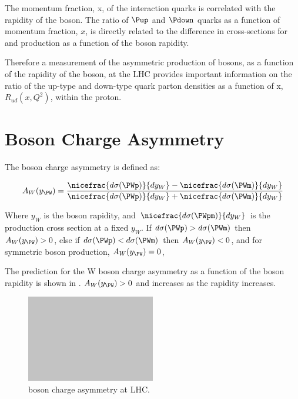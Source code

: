 The momentum fraction, x, of the interaction quarks is correlated
with the rapidity of the \PW boson. The ratio of $\Pup$ and $\Pdown$ quarks as
a function of momentum fraction, $x$, is directly related to the difference in
cross-sections for \PWp and \PWm production as a function of the boson
rapidity.

Therefore a measurement of the asymmetric production of \PW bosons, as a
function of the rapidity of the boson, at the \ac{LHC} provides important
information on the ratio of the up-type and down-type quark parton densities as
a function of x,
$R_{ud}(x,Q^2)$, within the proton. 

\section{\PW Boson Charge Asymmetry}

The \PWpm boson charge asymmetry is defined as:

\begin{equation}
  A_{W}(y_{\PW})=
    \frac{ 
      \nicefrac{ d\sigma (\PWp) }{ dy_{W} } -
      \nicefrac{ d\sigma (\PWm) }{ dy_{W} }
    }
    {
      \nicefrac{ d\sigma (\PWp) }{ dy_{W} } +
      \nicefrac{ d\sigma (\PWm) }{ dy_{W} }
    }
\label{wbos:wasym}
\end{equation} 

Where $y_{W}$ is the boson rapidity, and 
$\nicefrac{ d\sigma (\PWpm) }{ dy_{W} }$ is the \PWpm production cross section
at a fixed $y_{W}$.  
If $d\sigma(\PWp) > d\sigma(\PWm) $ then $A_{W}(y_{\PW})> 0$,
else if $d\sigma(\PWp) < d\sigma(\PWm) $ then $A_{W}(y_{\PW})< 0$,
and for symmetric \PWpm boson production, $A_{W}(y_{\PW})= 0$,

The prediction for the W boson charge asymmetry as a function of the boson
rapidity is shown in . $A_{W}(y_{\PW})> 0$ and
increases as the rapidity increases.

\begin{figure}[htb]
  \centering
  \includegraphics[width=0.5\textwidth]{placeholder}
  \caption{\PW boson charge asymmetry at LHC.}
  \label{wbos:chargeasym}
\end{figure}

